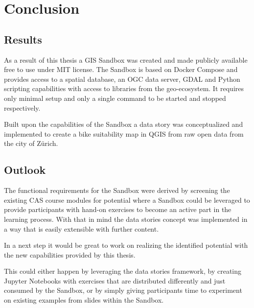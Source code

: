 \documentclass[11pt, a4paper, oneside, parskip=full-]{scrartcl}
\begin{document}
\section{Conclusion}

\subsection{Results}
As a result of this thesis a GIS Sandbox was created and made publicly available
free to use under MIT license\cite{osgeostacksandbox}. The Sandbox is based on
Docker Compose and provides access to a spatial database, an OGC data server,
GDAL and Python scripting capabilities with access to libraries from the
geo-ecosystem. It requires only minimal setup and only a single command to be
started and stopped respectively.

Built upon the capabilities of the Sandbox a data story was conceptualized and
implemented to create a bike suitability map in QGIS from raw open data from the
city of Zürich.

\subsection{Outlook}
The functional requirements for the Sandbox were derived by screening the
existing CAS course modules for potential where a Sandbox could be leveraged to
provide participants with hand-on exercises to become an active part in the
learning process. With that in mind the data stories concept was implemented in
a way that is easily extensible with further content.

In a next step it would be great to work on realizing the identified potential
with the new capabilities provided by this thesis.

This could either happen by leveraging the data stories framework, by creating
Jupyter Notebooks with exercises that are distributed differently and just
consumed by the Sandbox, or by simply giving participants time to experiment on
existing examples from slides within the Sandbox.

\newpage
\printbibliography
\end{document}
